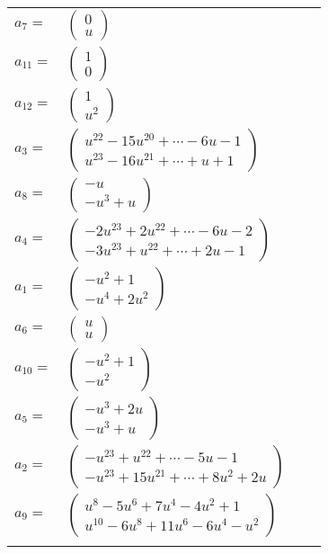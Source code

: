 \documentclass[1p]{elsarticle_modified}
\theoremstyle{definition}
\begin{document}
\begin{tabular}{m{7pt} m{180pt} m{7pt} m{180pt} }
\flushright $a_{7}=$&$\begin{pmatrix}0\\u\end{pmatrix}$ \\
\flushright $a_{11}=$&$\begin{pmatrix}1\\0\end{pmatrix}$ \\
\flushright $a_{12}=$&$\begin{pmatrix}1\\u^2\end{pmatrix}$ \\
\flushright $a_{3}=$&$\begin{pmatrix}u^{22}-15 u^{20}+\cdots-6 u-1\\u^{23}-16 u^{21}+\cdots+u+1\end{pmatrix}$ \\
\flushright $a_{8}=$&$\begin{pmatrix}- u\\- u^3+u\end{pmatrix}$ \\
\flushright $a_{4}=$&$\begin{pmatrix}-2 u^{23}+2 u^{22}+\cdots-6 u-2\\-3 u^{23}+u^{22}+\cdots+2 u-1\end{pmatrix}$ \\
\flushright $a_{1}=$&$\begin{pmatrix}- u^2+1\\- u^4+2 u^2\end{pmatrix}$ \\
\flushright $a_{6}=$&$\begin{pmatrix}u\\u\end{pmatrix}$ \\
\flushright $a_{10}=$&$\begin{pmatrix}- u^2+1\\- u^2\end{pmatrix}$ \\
\flushright $a_{5}=$&$\begin{pmatrix}- u^3+2 u\\- u^3+u\end{pmatrix}$ \\
\flushright $a_{2}=$&$\begin{pmatrix}- u^{23}+u^{22}+\cdots-5 u-1\\- u^{23}+15 u^{21}+\cdots+8 u^2+2 u\end{pmatrix}$ \\
\flushright $a_{9}=$&$\begin{pmatrix}u^8-5 u^6+7 u^4-4 u^2+1\\u^{10}-6 u^8+11 u^6-6 u^4- u^2\end{pmatrix}$\\&\end{tabular}
\end{document}
